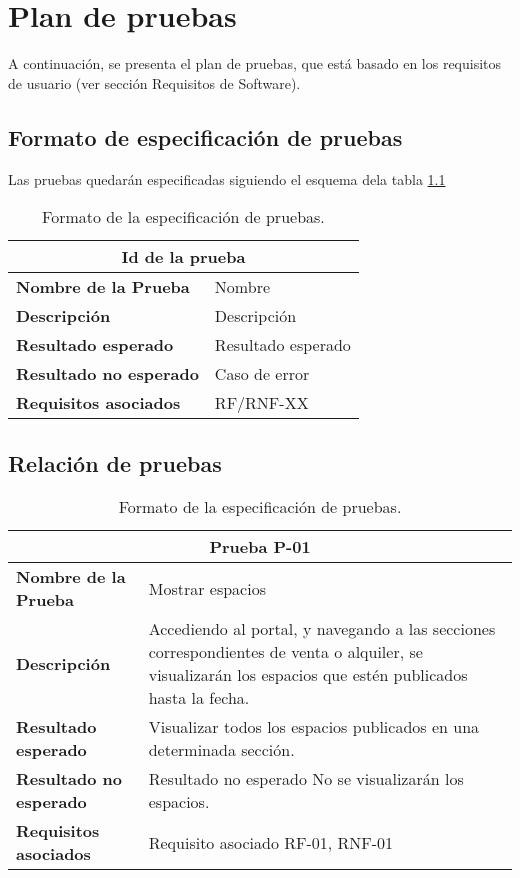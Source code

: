 \chapter{Plan de pruebas}
\par A continuación, se presenta el plan de pruebas, que está basado en los requisitos de usuario (ver sección Requisitos de Software).

\section{Formato de especificación de pruebas}
\par Las pruebas quedarán especificadas siguiendo el esquema dela tabla \ref{tab:provesFormat}


\begin{table}[h]
\begin{center}
\begin{tabular}{ l l }
\multicolumn{2}{c}{Id de la prueba} \\ \hline
\textbf{Nombre de la Prueba} & Nombre \\
\textbf{Descripción} & Descripción \\
\textbf{Resultado esperado} & Resultado esperado \\
\textbf{Resultado no esperado} & Caso de error \\
\textbf{Requisitos asociados} & RF/RNF-XX \\ \hline
\end{tabular}
\caption{Formato de la especificación de pruebas.}
\label{tab:provesFormat}
\end{center}
\end{table}



\section{Relación de pruebas}

\begin{table}[h]
\begin{center}
\begin{tabular}{ l l }
\multicolumn{2}{c}{Prueba P-01} \\ \hline
\textbf{Nombre de la Prueba} & Mostrar espacios \\
\textbf{Descripción} & Accediendo al portal, y navegando a las secciones correspondientes de venta o alquiler, se visualizarán los espacios que estén publicados hasta la fecha. \\
\textbf{Resultado esperado} & Visualizar todos los espacios publicados en una determinada sección. \\
\textbf{Resultado no esperado} & Resultado no esperado	No se visualizarán los espacios. \\
\textbf{Requisitos asociados} & Requisito asociado	RF-01, RNF-01 \\ \hline
\end{tabular}
\caption{Formato de la especificación de pruebas.}
\label{tab:P1}
\end{center}
\end{table}

